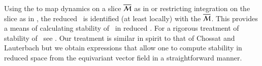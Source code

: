 


Using the {\mframes} to map dynamics on a slice $\overline{\cal M}$
as in  or restricting
integration on the slice as in ,
the reduced \statesp\ is
identified (at least locally) with the {\slice}
${\overline{\cal M}}$. This provides a means of calculating stability
of \reqva\ in reduced \statesp. For a
rigorous treatment of stability of \reqva\ see .
Our treatment is similar in spirit
to that of Chossat and Lauterbach but we obtain
expressions that allow one to compute stability in reduced space
from the equivariant vector field in a straightforward manner.

